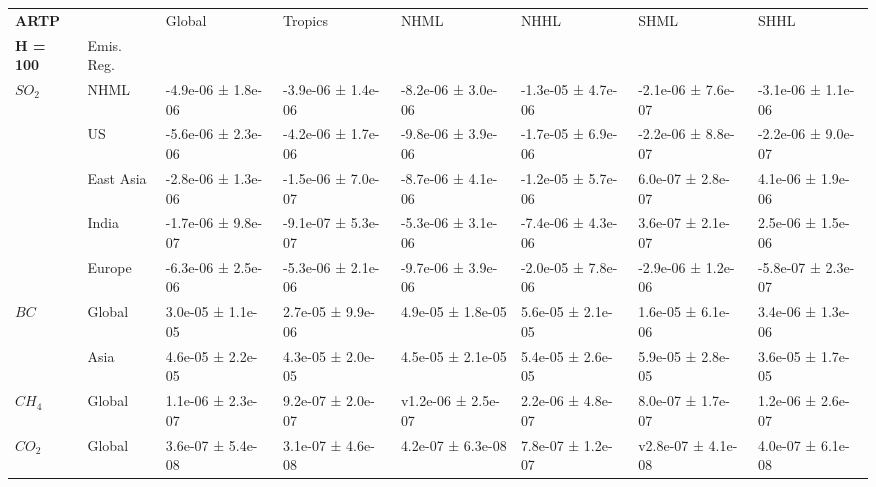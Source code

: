 \documentclass[preview]{standalone}
\newcommand{\nm}{\phantom{-}}
\begin{document}
	\tiny
	\begin{minipage}{\textwidth}
		\setlength\tabcolsep{5pt}
		\begin{tabular}{llllllll}
			\toprule
			\textbf{ARTP}       &        &               Global &              Tropics &                 NHML &                 NHHL &                 SHML &                 SHHL \\
			\textbf{H = 100}   & Emis. Reg. &                      &                      &                      &                      &                      &                      \\
			\midrule
$SO_2$ & NHML &  -4.9e-06 ±  1.8e-06 &  -3.9e-06 ±  1.4e-06 &  -8.2e-06 ±  3.0e-06 &  -1.3e-05 ±  4.7e-06 &  -2.1e-06 ±  7.6e-07 &  -3.1e-06 ±  1.1e-06 \\
       & US &  -5.6e-06 ±  2.3e-06 &  -4.2e-06 ±  1.7e-06 &  -9.8e-06 ±  3.9e-06 &  -1.7e-05 ±  6.9e-06 &  -2.2e-06 ±  8.8e-07 &  -2.2e-06 ±  9.0e-07 \\
       & East Asia &  -2.8e-06 ±  1.3e-06 &  -1.5e-06 ±  7.0e-07 &  -8.7e-06 ±  4.1e-06 &  -1.2e-05 ±  5.7e-06 &   \nm6.0e-07 ±  2.8e-07 &   \nm4.1e-06 ±  1.9e-06 \\
       & India &  -1.7e-06 ±  9.8e-07 &  -9.1e-07 ±  5.3e-07 &  -5.3e-06 ±  3.1e-06 &  -7.4e-06 ±  4.3e-06 &   \nm3.6e-07 ±  2.1e-07 &   \nm2.5e-06 ±  1.5e-06 \\
       & Europe &  -6.3e-06 ±  2.5e-06 &  -5.3e-06 ±  2.1e-06 &  -9.7e-06 ±  3.9e-06 &  -2.0e-05 ±  7.8e-06 &  -2.9e-06 ±  1.2e-06 &  -5.8e-07 ±  2.3e-07 \\
\cmidrule(lr){1-8}
$BC$ & Global &   \nm3.0e-05 ±  1.1e-05 &   \nm2.7e-05 ±  9.9e-06 &   \nm4.9e-05 ±  1.8e-05 &   \nm5.6e-05 ±  2.1e-05 &   \nm1.6e-05 ±  6.1e-06 &   \nm3.4e-06 ±  1.3e-06 \\
       & Asia &   \nm4.6e-05 ±  2.2e-05 &   \nm4.3e-05 ±  2.0e-05 &   \nm4.5e-05 ±  2.1e-05 &   \nm5.4e-05 ±  2.6e-05 &   \nm5.9e-05 ±  2.8e-05 &   \nm3.6e-05 ±  1.7e-05 \\
\cmidrule(lr){1-8}
$CH_4$ & Global &   \nm1.1e-06 ±  2.3e-07 &   \nm9.2e-07 ±  2.0e-07 &   v1.2e-06 ±  2.5e-07 &   \nm2.2e-06 ±  4.8e-07 &   \nm8.0e-07 ±  1.7e-07 &   \nm1.2e-06 ±  2.6e-07 \\
\cmidrule(lr){1-8}
$CO_2$ & Global &   \nm3.6e-07 ±  5.4e-08 &   \nm3.1e-07 ±  4.6e-08 &   \nm4.2e-07 ±  6.3e-08 &   \nm7.8e-07 ±  1.2e-07 &   v2.8e-07 ±  4.1e-08 &   \nm4.0e-07 ±  6.1e-08 \\
\bottomrule
\end{tabular}

        \end{minipage}
        
\end{document}
